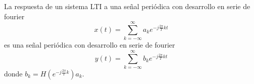 \begin{property}
    La respuesta de un sistema LTI a una señal periódica con desarrollo en serie de fourier 
    \begin{equation*}
        x(t) = \sum_{k=-\infty}^{\infty} a_k e^{-j\frac{2\pi}{T}kt}
    \end{equation*}
    es una señal periódica con desarrollo en serie de fourier 
    \begin{equation*}
        y(t) = \sum_{k=-\infty}^{\infty} b_k e^{-j\frac{2\pi}{T}kt}    
    \end{equation*}
    donde $b_k = H\left(e^{-j\frac{2\pi}{T}k}\right)a_k$.
\end{property}